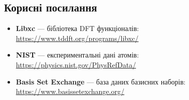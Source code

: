 \subsection{Корисні посилання}

\begin{itemize}
    \item \textbf{Libxc} --- бібліотека DFT функціоналів: \url{https://www.tddft.org/programs/libxc/}
    \item \textbf{NIST} --- експериментальні дані атомів: \url{https://physics.nist.gov/PhysRefData/}
    \item \textbf{Basis Set Exchange} --- база даних базисних наборів: \url{https://www.basissetexchange.org/}
\end{itemize}
